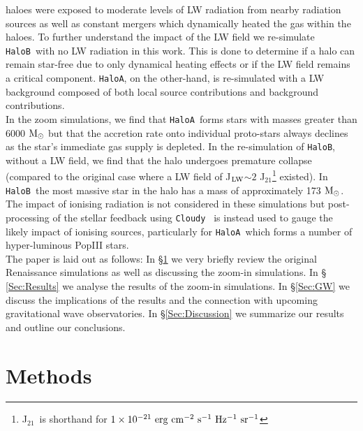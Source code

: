 \documentclass[twocolumn,iop,revtex4]{openjournal}
\newcommand{\cloudy}{\texttt{Cloudy~}}
\newcommand{\msolar} {$\rm{M_{\odot}}~$}
\newcommand{\msolarc} {$\rm{M_{\odot}}$}
\newcommand{\JLW} {J$_{\rm LW}$}
\newcommand{\ha} {\texttt{HaloA~}}
\newcommand{\hb} {\texttt{HaloB~}}
\newcommand{\hac} {\texttt{HaloA}}
\newcommand{\hbc} {\texttt{HaloB}}
\begin{document}
  haloes were exposed to moderate levels of LW radiation from nearby radiation sources as well as
  constant mergers which dynamically heated the gas within the haloes. To further understand the
  impact of the LW field we re-simulate \hb with no LW radiation in this work. This is done to
  determine if a halo can remain star-free due to only dynamical heating effects or if the LW field 
  remains a critical component. \hac, on the other-hand, is re-simulated with a LW background
  composed of both local source contributions and background contributions. \\
  \indent In the zoom simulations, we find that \ha forms stars with masses greater than
  6000 \msolar but that the accretion rate onto individual proto-stars always declines as the star's
  immediate gas supply is depleted. In the re-simulation of \hbc, without a LW field, we find that
  the halo undergoes premature collapse (compared to the original case where a LW field of
  \JLW $\sim 2$ J$_{21}$\footnote{J$_{21}$\ is shorthand for $1 \times 10^{-21} \ \rm{ erg\ cm^{-2}\ s^{-1}\ Hz^{-1}\ sr^{-1}}$} existed). In \hb the most massive star in the halo has a mass of
  approximately 173 \msolarc. The impact of ionising radiation is not considered in these
  simulations but post-processing of the stellar feedback using \cloudy \citep{Ferland_2017} is
  instead used to gauge the likely impact of ionising sources, particularly for \ha which forms a
  number of hyper-luminous PopIII stars. \\
  \indent The paper is laid out as follows: In \S \ref{Sec:Methods} we very briefly review the
  original Renaissance simulations as well as discussing the zoom-in simulations. In \S
  \ref{Sec:Results} we analyse the results of the zoom-in simulations. In \S \ref{Sec:GW} we
  discuss the implications of the results and the connection with upcoming gravitational wave
  observatories. In \S \ref{Sec:Discussion} we summarize our results and outline
  our conclusions.

\section{Methods} \label{Sec:Methods}
\end{document}
